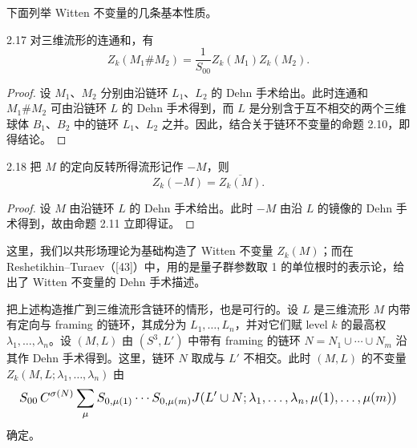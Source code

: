 下面列举 Witten 不变量的几条基本性质。

\begin{proposition*}{2.17}
  对三维流形的连通和，有
  \[
    Z_k(M_1\# M_2)=\frac{1}{S_{00}}Z_k(M_1)Z_k(M_2).
  \]
\end{proposition*}

\begin{proof}
  设 $M_1$、$M_2$ 分别由沿链环 $L_1$、$L_2$ 的 Dehn 手术给出。此时连通和 $M_1\# M_2$ 可由沿链环 $L$ 的 Dehn 手术得到，而 $L$ 是分别含于互不相交的两个三维球体 $B_1$、$B_2$ 中的链环 $L_1$、$L_2$ 之并。因此，结合关于链环不变量的命题 2.10，即得结论。
\end{proof}

\begin{proposition*}{2.18}
  把 $M$ 的定向反转所得流形记作 $-M$，则
  \[
    Z_k(-M)=\overline{Z_k(M)}.
  \]
\end{proposition*}

\begin{proof}
  设 $M$ 由沿链环 $L$ 的 Dehn 手术给出。此时 $-M$ 由沿 $L$ 的镜像的 Dehn 手术得到，故由命题 2.11 立即得证。
\end{proof}


这里，我们以共形场理论为基础构造了 Witten 不变量 $Z_k(M)$；而在 Reshetikhin--Turaev（[43]）中，用的是量子群参数取 1 的单位根时的表示论，给出了 Witten 不变量的 Dehn 手术描述。

把上述构造推广到三维流形含链环的情形，也是可行的。设 $L$ 是三维流形 $M$ 内带有定向与 framing 的链环，其成分为 $L_1,\dots,L_n$，并对它们赋 level $k$ 的最高权 $\lambda_1,\dots,\lambda_n$。设 $(M,L)$ 由 $(S^3,L')$ 中带有 framing 的链环 $N=N_1\cup\cdots\cup N_m$ 沿其作 Dehn 手术得到。这里，链环 $N$ 取成与 $L'$ 不相交。此时 $(M,L)$ 的不变量 $Z_k(M,L;\lambda_1,\dots,\lambda_n)$ 由
\[
  \resizebox{0.98\textwidth}{!}{$\displaystyle
    S_{00}\,C^{\sigma(N)}\sum_{\mu}S_{0,\mu(1)}\cdots S_{0,\mu(m)}J(L'\cup N;\lambda_1,\dots,\lambda_n,\mu(1),\dots,\mu(m))$}
\]
确定。

